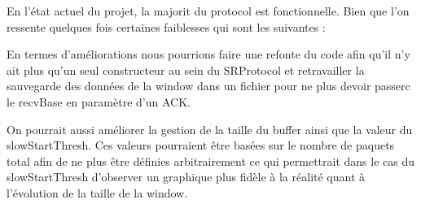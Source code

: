 \documentclass[../rapport.tex]{subfiles}
\begin{document}
	
	En l'état actuel du projet, la majorit du protocol est fonctionnelle. Bien que l'on ressente quelques fois certaines faiblesses qui sont les suivantes :

	\medskip

	En termes d'améliorations nous pourrions faire une refonte du code afin qu'il n'y ait plus qu'un seul constructeur au sein du SRProtocol et retravailler la sauvegarde des données de la window
	dans un fichier pour ne plus devoir passerc le recvBase en paramètre d'un ACK. 

	\medskip

	On pourrait aussi améliorer la gestion de la taille du buffer ainsi que la valeur du slowStartThresh. Ces valeurs pourraient être basées sur le nombre de paquets total afin de ne plus 
	être définies arbitrairement ce qui permettrait dans le cas du slowStartThresh d'observer un graphique plus fidèle à la réalité quant à l'évolution de la taille de la window.
\end{document}
